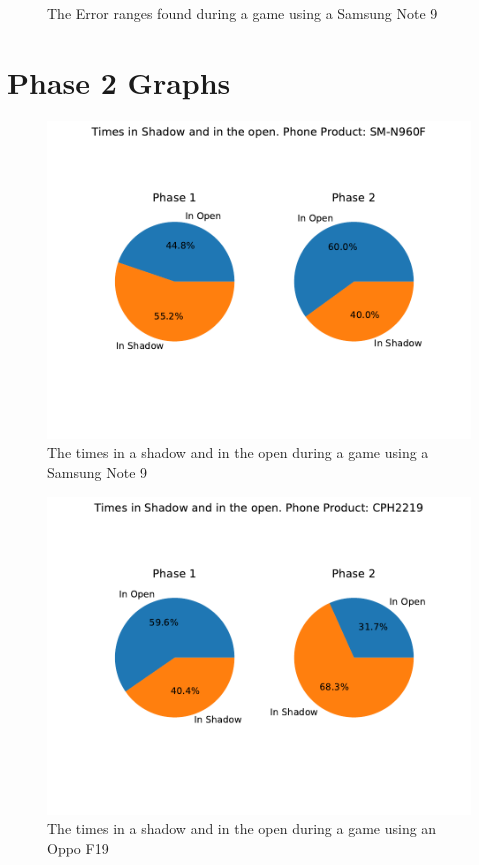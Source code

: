 \documentclass{l4proj}
\begin{document}
\begin{appendices}
\begin{figure}
    \caption{The Error ranges found during a game using a Samsung Note 9}
    \label{fig:note9}
\end{figure}

\chapter{Phase 2 Graphs}
\begin{figure}
    \centering
    \includegraphics[width=0.8\linewidth]{images/SM-N960F_piechart.pdf}
    \caption{The times in a shadow and in the open during a game using a Samsung Note 9}
    \label{fig:shadownote9}
\end{figure}
\begin{figure}
    \centering
    \includegraphics[width=0.8\linewidth]{images/CPH2219_piechart.pdf}
    \caption{The times in a shadow and in the open during a game using an Oppo F19}
    \label{fig:shadowoppo}
\end{figure}
\begin{figure}
    \centering

\end{figure}
\end{appendices}
\end{document}
